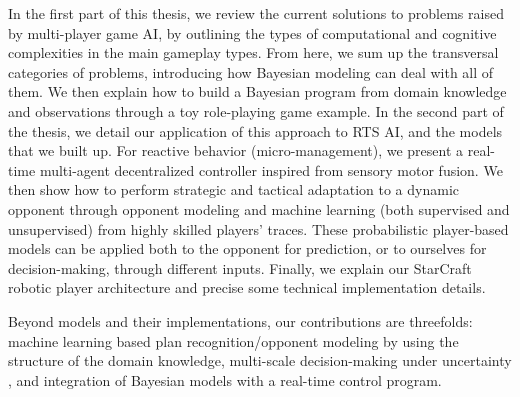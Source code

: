 \documentclass[a4paper,12pt]{article}
\begin{document}
In the first part of this thesis, we review the current solutions to problems raised by multi-player game AI, by outlining the types of computational and cognitive complexities in the main gameplay types. From here, we sum up the transversal categories of problems, introducing how Bayesian modeling can deal with all of them. We then explain how to build a Bayesian program from domain knowledge and observations through a toy role-playing game example. In the second part of the thesis, we detail our application of this approach to RTS AI, and the models that we built up. For reactive behavior (micro-management), we present a real-time multi-agent decentralized controller inspired from sensory motor fusion. We then show how to perform strategic and tactical adaptation to a dynamic opponent through opponent modeling and machine learning (both supervised and unsupervised) from highly skilled players' traces. These probabilistic player-based models can be applied both to the opponent for prediction, or to ourselves for decision-making, through different inputs. Finally, we explain our StarCraft robotic player architecture and precise some technical implementation details.

Beyond models and their implementations, our contributions are threefolds: machine learning based plan recognition/opponent modeling %
by using the structure of the domain knowledge, multi-scale decision-making under uncertainty%
, and integration of Bayesian models with a real-time control program.
\end{document}
